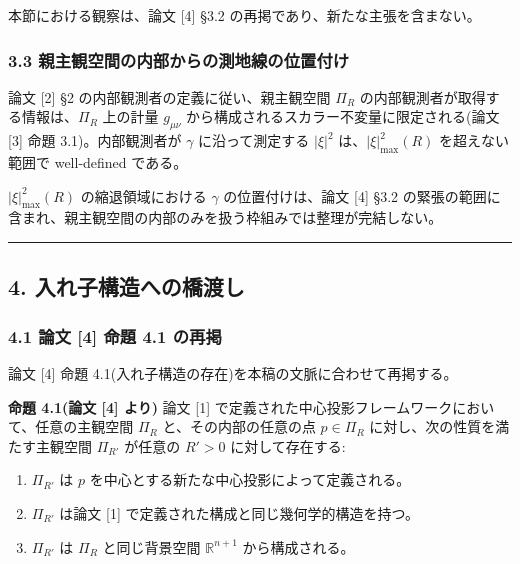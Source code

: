 \documentclass[a4paper,11pt]{ltjsarticle}
\theoremstyle{definition}
\providecommand{\tightlist}{\setlength{\itemsep}{0pt}\setlength{\parskip}{0pt}}
\begin{document}
本節における観察は、論文 {[}4{]} §3.2 の再掲であり、新たな主張を含まない。

\subsubsection{3.3 親主観空間の内部からの測地線の位置付け}\label{ux89aaux4e3bux89b3ux7a7aux9593ux306eux5185ux90e8ux304bux3089ux306eux6e2cux5730ux7ddaux306eux4f4dux7f6eux4ed8ux3051}

論文 {[}2{]} §2 の内部観測者の定義に従い、親主観空間 \(\Pi_R\) の内部観測者が取得する情報は、\(\Pi_R\) 上の計量 \(g_{\mu\nu}\) から構成されるスカラー不変量に限定される(論文 {[}3{]} 命題 3.1)。内部観測者が \(\gamma\) に沿って測定する \(|\xi|^2\) は、\(|\xi|^2_{\max}(R)\) を超えない範囲で well-defined である。

\(|\xi|^2_{\max}(R)\) の縮退領域における \(\gamma\) の位置付けは、論文 {[}4{]} §3.2 の緊張の範囲に含まれ、親主観空間の内部のみを扱う枠組みでは整理が完結しない。

\begin{center}\rule{0.5\linewidth}{0.5pt}\end{center}

\subsection{4. 入れ子構造への橋渡し}\label{ux5165ux308cux5b50ux69cbux9020ux3078ux306eux6a4bux6e21ux3057}

\subsubsection{4.1 論文 {[}4{]} 命題 4.1 の再掲}\label{ux8ad6ux6587-4-ux547dux984c-4.1-ux306eux518dux63b2}

論文 {[}4{]} 命題 4.1(入れ子構造の存在)を本稿の文脈に合わせて再掲する。

\textbf{命題 4.1(論文 {[}4{]} より)} 論文 {[}1{]} で定義された中心投影フレームワークにおいて、任意の主観空間 \(\Pi_R\) と、その内部の任意の点 \(p \in \Pi_R\) に対し、次の性質を満たす主観空間 \(\Pi_{R'}\) が任意の \(R' > 0\) に対して存在する:

\begin{enumerate}
\def\labelenumi{\arabic{enumi}.}
\tightlist
\item
  \(\Pi_{R'}\) は \(p\) を中心とする新たな中心投影によって定義される。
\item
  \(\Pi_{R'}\) は論文 {[}1{]} で定義された構成と同じ幾何学的構造を持つ。
\item
  \(\Pi_{R'}\) は \(\Pi_R\) と同じ背景空間 \(\mathbb{R}^{n+1}\) から構成される。
\end{enumerate}
\end{document}

